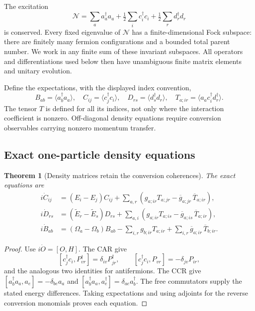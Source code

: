 \documentclass[11pt]{article}
\newtheorem{theorem}{Theorem}[section]
\theoremstyle{remark}
\begin{document}
The excitation
\[
 \mathcal N=\sum_a a_a^\dagger a_a+
       \tfrac12\sum_i c_i^\dagger c_i+
       \tfrac12\sum_r d_r^\dagger d_r
\]
is conserved.  Every fixed eigenvalue of \(\mathcal N\)
has a finite-dimensional Fock subspace: there are finitely
many fermion configurations and a bounded total parent
number.  We work in any finite sum of these invariant
subspaces.  All operators and differentiations used below
then have unambiguous finite matrix elements and unitary
evolution.

Define the expectations, with the displayed index convention,
\[
 B_{ab}=\langle a_b^\dagger a_a\rangle,\quad
 C_{ij}=\langle c_j^\dagger c_i\rangle,\quad
 D_{rs}=\langle d_s^\dagger d_r\rangle,\quad
 T_{a;ir}=\langle a_a c_i^\dagger d_r^\dagger\rangle .
\]
The tensor \(T\) is defined for all its indices, not only
where the interaction coefficient is nonzero.  Off-diagonal
density equations require conversion observables carrying
nonzero momentum transfer.

\subsection{Exact one-particle density equations}

\begin{theorem}[Density matrices retain the conversion coherences]
\label{thm:v20v69-densities}
The exact equations are
\[
 \begin{aligned}
 i\dot C_{ij}&=(E_i-E_j)C_{ij}
       +\sum_{a,r}
       (g_{a;ir}T_{a;jr}-\overline g_{a;jr}\,\overline T_{a;ir}),\\
 i\dot D_{rs}&=(\widetilde E_r-\widetilde E_s)D_{rs}
       +\sum_{a,i}
       (g_{a;ir}T_{a;is}-\overline g_{a;is}\,\overline T_{a;ir}),\\
 i\dot B_{ab}&=(\Omega_a-\Omega_b)B_{ab}
       -\sum_{i,r}g_{b;ir}T_{a;ir}
       +\sum_{i,r}\overline g_{a;ir}\,\overline T_{b;ir}.
 \end{aligned}
\]
\end{theorem}
\begin{proof}
Use \(i\dot O=[O,H]\).  The CAR give
\[
 [c_j^\dagger c_i,P_{vr}^\dagger]
             =\delta_{iv}P_{jr}^\dagger,\qquad
 [c_j^\dagger c_i,P_{vr}]
             =-\delta_{jv}P_{ir},
\]
and the analogous two identities for antifermions.
The CCR give
\([a_b^\dagger a_a,a_e]=-\delta_{be}a_a\) and
\([a_b^\dagger a_a,a_e^\dagger]=\delta_{ae}a_b^\dagger\).
The free commutators supply the stated energy differences.
Taking expectations and using adjoints for the reverse
conversion monomials proves each equation.
\end{proof}
\end{document}
